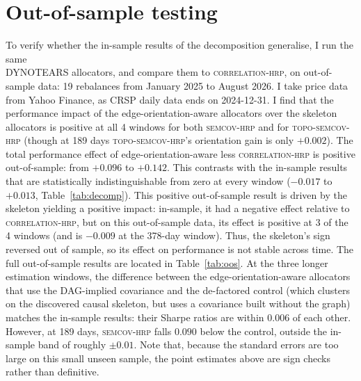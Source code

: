 \documentclass[11pt, a4paper]{report}
\newcommand{\corrhrp}{\textsc{correlation-hrp}}
\newcommand{\semcovhrp}{\textsc{semcov-hrp}}
\newcommand{\toposemcovhrp}{\textsc{topo-semcov-hrp}}
\begin{document}
\section{Out-of-sample testing}
\label{sec:oos}

To verify whether the in-sample results of the decomposition generalise, I run the same \\
DYNOTEARS allocators, and compare them to \corrhrp{}, on out-of-sample data: 19 rebalances from January 2025 to August 2026. 
I take price data from Yahoo Finance, as CRSP daily data ends on 2024-12-31. 
I find that the performance impact of the edge-orientation-aware allocators over the skeleton allocators is positive at all 4 windows for both \semcovhrp{} and for \toposemcovhrp{} (though at 189 days \toposemcovhrp{}'s orientation gain is only $+0.002$).
The total performance effect of edge-orientation-aware less \corrhrp{} is positive out-of-sample: from $+0.096$ to $+0.142$. This contrasts with the in-sample results that are statistically indistinguishable from zero at every window ($-0.017$ to $+0.013$, Table~\ref{tab:decomp}). This positive out-of-sample result is driven by the skeleton yielding a positive impact: in-sample, it had a negative effect relative to \corrhrp{}, but on this out-of-sample data, its effect is positive at 3 of the 4 windows (and is $-0.009$ at the 378-day window).
Thus, the skeleton's sign reversed out of sample, so its effect on performance is not stable across time.
The full out-of-sample results are located in Table~\ref{tab:oos}.
At the three longer estimation windows, the difference between the edge-orientation-aware allocators that use the DAG-implied covariance and the de-factored control (which clusters on the discovered causal skeleton, but uses a covariance built without the graph) matches the in-sample results: their Sharpe ratios are within $0.006$ of each other. 
However, at 189 days, \semcovhrp{} falls $0.090$ below the control, outside the in-sample band of roughly $\pm0.01$.
Note that, because the standard errors are too large on this small unseen sample, the point estimates above are sign checks rather than definitive.
\end{document}
